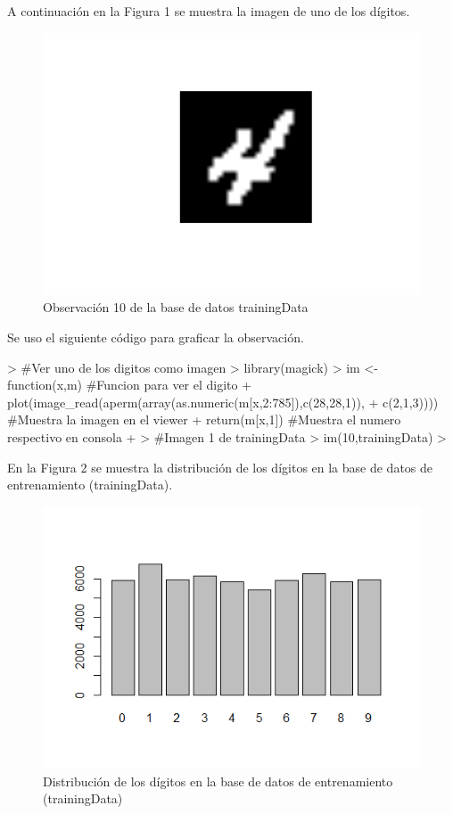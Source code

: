 \documentclass{article}
\begin{document}
A continuación en la Figura 1 se muestra la imagen de uno de los dígitos.

\begin{figure}[H]
    \centering
	\includegraphics{figure/digito.png}
	\caption{Observación 10 de la base de datos trainingData}
\end{figure}

Se uso el siguiente código para graficar la observación.

\begin{Schunk}
\begin{Sinput}
> #Ver uno de los digitos como imagen
> library(magick)
> im <- function(x,m){ #Funcion para ver el digito
+   plot(image_read(aperm(array(as.numeric(m[x,2:785]),c(28,28,1)),
+                         c(2,1,3)))) #Muestra la imagen en el viewer
+   return(m[x,1]) #Muestra el numero respectivo en consola
+ }
> #Imagen 1 de trainingData
> im(10,trainingData)
> 
\end{Sinput}
\end{Schunk}


En la Figura 2 se muestra la distribución de los dígitos en la base de datos de entrenamiento (trainingData).

\begin{figure}[H]
    \centering
	\includegraphics{figure/entrena.png}
	\caption{Distribución de los dígitos en la base de datos de entrenamiento (trainingData)}
\end{figure}
\end{document}
